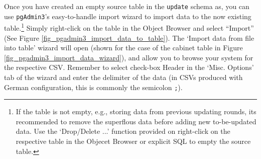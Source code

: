 Once you have created an empty source table in the \texttt{update} schema as, you can use \texttt{pgAdmin3}'s easy-to-handle import wizard to import data to the now existing table.\footnote{%
If the table is not empty, e.g., storing data from previous updating rounds, its recommended to remove the superflous data before adding new to-be-updated data. 
Use the `Drop/Delete ...' function provided on right-click on the respective table in the Objecet Browser or explicit SQL to empty the source table.}
Simply right-click on the table in the Object Browser and select ``Import'' (See Figure \ref{fig_pgadmin3_import_data_to_table}). 
The `Import data from file into table' wizard will open (shown for the case of the cabinet table in Figure \ref{fig_pgadmin3_import_data_wizard}), and allow you to browse your system for the respective CSV. 
Remember to select check-box Header in the `Misc. Options' tab of the wizard and enter the delimiter of the data (in CSVs produced with German configuration, this is commonly the semicolon \texttt{;}).

